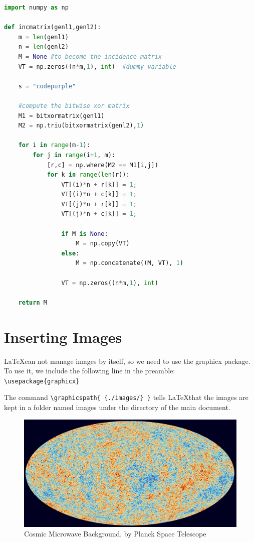 \documentclass[letterpaper,dvipsnames]{article}
\begin{document}
\lstset{style=python-style}
\begin{lstlisting}[language=Python, caption=Python example]
import numpy as np
    
def incmatrix(genl1,genl2):
    m = len(genl1)
    n = len(genl2)
    M = None #to become the incidence matrix
    VT = np.zeros((n*m,1), int)  #dummy variable

    s = "codepurple"
    
    #compute the bitwise xor matrix
    M1 = bitxormatrix(genl1)
    M2 = np.triu(bitxormatrix(genl2),1) 
    
    for i in range(m-1):
        for j in range(i+1, m):
            [r,c] = np.where(M2 == M1[i,j])
            for k in range(len(r)):
                VT[(i)*n + r[k]] = 1;
                VT[(i)*n + c[k]] = 1;
                VT[(j)*n + r[k]] = 1;
                VT[(j)*n + c[k]] = 1;
    
                if M is None:
                    M = np.copy(VT)
                else:
                    M = np.concatenate((M, VT), 1)
    
                VT = np.zeros((n*m,1), int)
    
    return M
\end{lstlisting}

\newpage
\section{Inserting Images}
\LaTeX can not manage images by itself, so we need to use the graphicx package. 
To use it, we include the following line in the preamble: \\
\verb+\usepackage{graphicx}+

The command \verb+\graphicspath{ {./images/} }+ tells \LaTeX that the images 
are kept in a folder named images under the directory of the main document.

\begin{figure}[h]
\includegraphics[width=\textwidth]{cosmic-microwave-background}
\caption{Cosmic Microwave Background, by Planck Space Telescope}
\end{figure}
\end{document}
